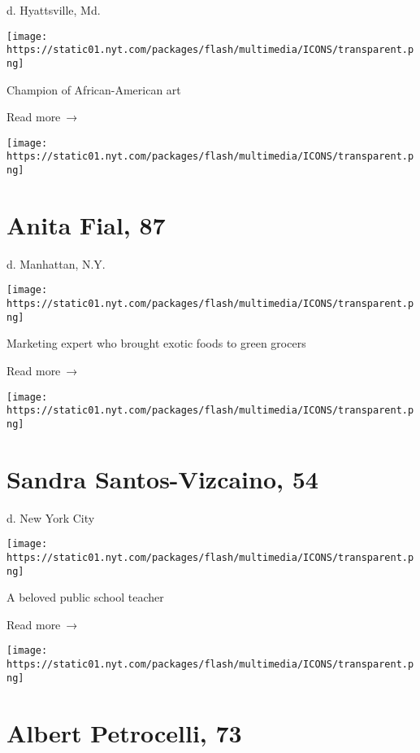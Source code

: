 d. Hyattsville, Md.

\texttt{[image: https://static01.nyt.com/packages/flash/multimedia/ICONS/transparent.png]}

Champion of African-American art

 Read more~→

\href{https://www.nytimes.com/2020/04/07/obituaries/anita-fial-dead-coronavirus.html}{}

\texttt{[image: https://static01.nyt.com/packages/flash/multimedia/ICONS/transparent.png]}

\hypertarget{anita-fial-87}{%
\section{Anita Fial, 87}\label{anita-fial-87}}

d. Manhattan, N.Y.

\texttt{[image: https://static01.nyt.com/packages/flash/multimedia/ICONS/transparent.png]}

Marketing expert who brought exotic foods to green grocers

 Read more~→

\href{https://www.nytimes.com/2020/04/07/obituaries/sandra-santos-vizcaino-dead-coronavirus.html}{}

\texttt{[image: https://static01.nyt.com/packages/flash/multimedia/ICONS/transparent.png]}

\hypertarget{sandra-santos-vizcaino-54}{%
\section{Sandra Santos-Vizcaino, 54}\label{sandra-santos-vizcaino-54}}

d. New York City

\texttt{[image: https://static01.nyt.com/packages/flash/multimedia/ICONS/transparent.png]}

A beloved public school teacher

 Read more~→

\href{https://www.nytimes.com/2020/04/07/obituaries/albert-petrocelli-dead-coronavirus.html}{}

\texttt{[image: https://static01.nyt.com/packages/flash/multimedia/ICONS/transparent.png]}

\hypertarget{albert-petrocelli-73}{%
\section{Albert Petrocelli, 73}\label{albert-petrocelli-73}}

